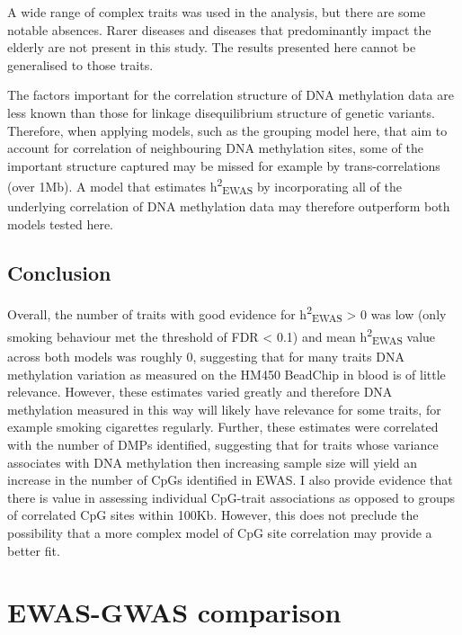 \documentclass[11pt,oneside]{bristolthesis}
\begin{document}
A wide range of complex traits was used in the analysis, but there are some notable absences. Rarer diseases and diseases that predominantly impact the elderly are not present in this study. The results presented here cannot be generalised to those traits.

The factors important for the correlation structure of DNA methylation data are less known than those for linkage disequilibrium structure of genetic variants. Therefore, when applying models, such as the grouping model here, that aim to account for correlation of neighbouring DNA methylation sites, some of the important structure captured may be missed for example by trans-correlations (over 1Mb). A model that estimates h\textsuperscript{2}\textsubscript{EWAS} by incorporating all of the underlying correlation of DNA methylation data may therefore outperform both models tested here.

\hypertarget{conclusion-05}{%
\section{Conclusion}\label{conclusion-05}}

Overall, the number of traits with good evidence for h\textsuperscript{2}\textsubscript{EWAS} \textgreater{} 0 was low (only smoking behaviour met the threshold of FDR \textless{} 0.1) and mean h\textsuperscript{2}\textsubscript{EWAS} value across both models was roughly 0, suggesting that for many traits DNA methylation variation as measured on the HM450 BeadChip in blood is of little relevance. However, these estimates varied greatly and therefore DNA methylation measured in this way will likely have relevance for some traits, for example smoking cigarettes regularly. Further, these estimates were correlated with the number of DMPs identified, suggesting that for traits whose variance associates with DNA methylation then increasing sample size will yield an increase in the number of CpGs identified in EWAS. I also provide evidence that there is value in assessing individual CpG-trait associations as opposed to groups of correlated CpG sites within 100Kb. However, this does not preclude the possibility that a more complex model of CpG site correlation may provide a better fit.

\hypertarget{ewas-gwas-comp-chapter}{%
\chapter{EWAS-GWAS comparison}\label{ewas-gwas-comp-chapter}}
\end{document}
